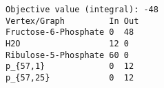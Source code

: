 \begin{verbatim}
Objective value (integral): -48
Vertex/Graph         In Out 
Fructose-6-Phosphate 0  48  
H2O                  12 0   
Ribulose-5-Phosphate 60 0   
p_{57,1}             0  12  
p_{57,25}            0  12  
\end{verbatim}
